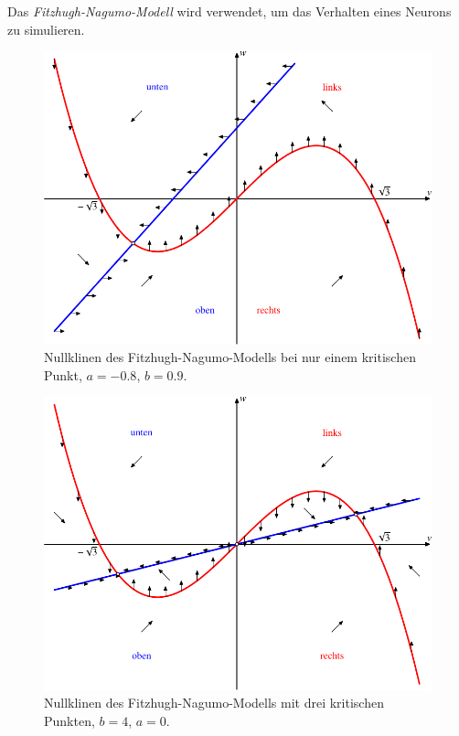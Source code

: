\begin{beispiel}
Das {\em Fitzhugh-Nagumo-Modell} wird verwendet, um das Verhalten eines
Neurons zu simulieren.
\begin{figure}
\centering
\includegraphics{chapters/images/nullklinen-5.pdf}
\caption{Nullklinen des Fitzhugh-Nagumo-Modells bei nur einem kritischen Punkt,
$a=-0.8$, $b=0.9$.
\label{geometrie:nullklinen-fh-1}}
\end{figure}
\begin{figure}
\centering
\includegraphics{chapters/images/nullklinen-6.pdf}
\caption{Nullklinen des Fitzhugh-Nagumo-Modells mit drei kritischen Punkten,
$b=4$, $a=0$.
\label{geometrie:nullklinen-fh-2}}

\end{figure}
\end{beispiel}
